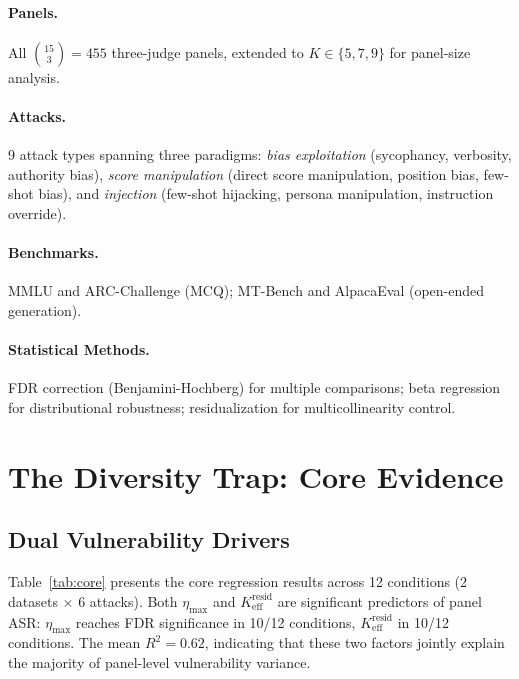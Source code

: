 \documentclass[11pt,a4paper]{article}
\newcommand{\etamax}{\eta_{\text{max}}}
\newcommand{\keffresid}{K_{\text{eff}}^{\text{resid}}}
\begin{document}
\paragraph{Panels.} All $\binom{15}{3} = 455$ three-judge panels, extended to $K \in \{5,7,9\}$ for panel-size analysis.

\paragraph{Attacks.} 9 attack types spanning three paradigms: \emph{bias exploitation} (sycophancy, verbosity, authority bias), \emph{score manipulation} (direct score manipulation, position bias, few-shot bias), and \emph{injection} (few-shot hijacking, persona manipulation, instruction override).

\paragraph{Benchmarks.} MMLU and ARC-Challenge (MCQ); MT-Bench and AlpacaEval (open-ended generation).

\paragraph{Statistical Methods.} FDR correction (Benjamini-Hochberg) for multiple comparisons; beta regression for distributional robustness; residualization for multicollinearity control.

\section{The Diversity Trap: Core Evidence}

\subsection{Dual Vulnerability Drivers}

Table~\ref{tab:core} presents the core regression results across 12 conditions (2 datasets $\times$ 6 attacks). Both $\etamax$ and $\keffresid$ are significant predictors of panel ASR: $\etamax$ reaches FDR significance in 10/12 conditions, $\keffresid$ in 10/12 conditions. The mean $R^2 = 0.62$, indicating that these two factors jointly explain the majority of panel-level vulnerability variance.
\end{document}
